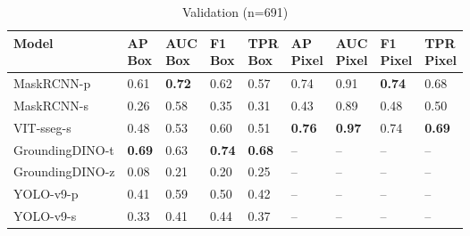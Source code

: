 \begin{table*}[t]
\ifwacv \else \ResultCaption \fi
\centering

    \begin{subtable}[b]{\textwidth} %
    \caption{Validation (n=691)}
    \centering
        \begin{tabular}{lllllllll}
        \toprule
         Model           & \makecell{AP\\Box}   & \makecell{AUC\\Box}   & \makecell{F1\\Box}   & \makecell{TPR\\Box}   & \makecell{AP\\Pixel}   & \makecell{AUC\\Pixel}   & \makecell{F1\\Pixel}   & \makecell{TPR\\Pixel}   \\
        \midrule
         MaskRCNN-p      & 0.61                 & \textbf{0.72}         & 0.62                 & 0.57                  & 0.74                   & 0.91                    & \textbf{0.74}          & 0.68                    \\
         MaskRCNN-s      & 0.26                 & 0.58                  & 0.35                 & 0.31                  & 0.43                   & 0.89                    & 0.48                   & 0.50                    \\
         VIT-sseg-s      & 0.48                 & 0.53                  & 0.60                 & 0.51                  & \textbf{0.76}          & \textbf{0.97}           & 0.74                   & \textbf{0.69}           \\
         GroundingDINO-t & \textbf{0.69}        & 0.63                  & \textbf{0.74}        & \textbf{0.68}         & --                     & --                      & --                     & --                      \\
         GroundingDINO-z & 0.08                 & 0.21                  & 0.20                 & 0.25                  & --                     & --                      & --                     & --                      \\
         YOLO-v9-p       & 0.41                 & 0.59                  & 0.50                 & 0.42                  & --                     & --                      & --                     & --                      \\
         YOLO-v9-s       & 0.33                 & 0.41                  & 0.44                 & 0.37                  & --                     & --                      & --                     & --                      \\
        \bottomrule
        \end{tabular}
    \end{subtable}


\end{table*}
